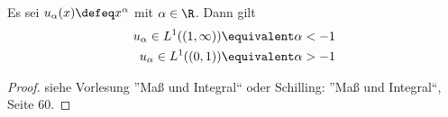 \begin{exercisePage}
	\vspace{\parskip}
	
	\begin{lemma} \label{lemma: 6.1}
		Es sei $u_\alpha (x) \defeq x^\alpha$ mit $\alpha \in \R$. Dann gilt
		\begin{equation*}
			\begin{aligned}
				u_\alpha \in L^1((1,\infty)) &\equivalent \alpha < -1 \\
				u_\alpha \in L^1((0,1)) &\equivalent \alpha > -1
			\end{aligned}
		\end{equation*}
	\end{lemma}
	\begin{proof}
		siehe Vorlesung ''Maß und Integral`` oder Schilling: ''Maß und Integral``, Seite 60.
	\end{proof}



\end{exercisePage}
